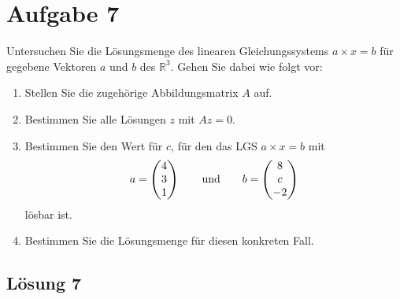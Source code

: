 \documentclass[main.tex]{subfiles}
\begin{document}
\section{Aufgabe 7}
Untersuchen Sie die Lösungsmenge des linearen Gleichungssystems $a\times x = b$ für gegebene Vektoren $a$ und $b$ des $\mathbb{R}^3$. Gehen Sie dabei wie folgt vor:
\begin{enumerate}
    \item Stellen Sie die zugehörige Abbildungsmatrix $A$ auf.
    \item Bestimmen Sie alle Lösungen $z$ mit $Az=0$.
    \item Bestimmen Sie den Wert für $c$, für den das LGS $a\times x =b$ mit
          $$
            a = \vektor{4 \\ 3 \\ 1} \qquad \text{und} \qquad b = \vektor{8 \\ c \\ -2}
          $$
          lösbar ist.
    \item Bestimmen Sie die Lösungsmenge für diesen konkreten Fall.
\end{enumerate}

\subsection{Lösung 7}
\end{document}
